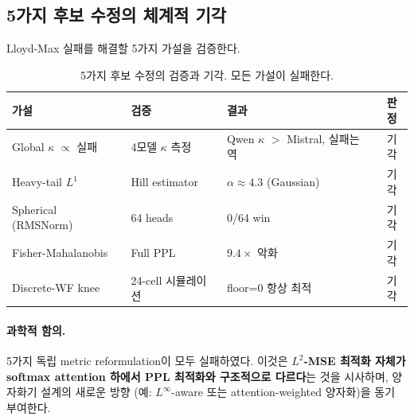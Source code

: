 \subsection{5가지 후보 수정의 체계적 기각}
\label{sec:exp_rejections}

Lloyd-Max 실패를 해결할 5가지 가설을 검증한다.

\begin{table}[t]
\centering
\caption{5가지 후보 수정의 검증과 기각. 모든 가설이 실패한다.}
\label{tab:rejections}
\small
\begin{tabular}{@{}p{2.5cm}p{3.8cm}p{2.5cm}c@{}}
\toprule
가설 & 검증 & 결과 & 판정 \\
\midrule
Global $\kappa$ $\propto$ 실패 & 4모델 $\kappa$ 측정 & Qwen $\kappa$ $>$ Mistral, 실패는 역 & 기각 \\
Heavy-tail $L^1$ & Hill estimator & $\alpha \approx 4.3$ (Gaussian) & 기각 \\
Spherical (RMSNorm) & 64 heads & 0/64 win & 기각 \\
Fisher-Mahalanobis & Full PPL & $9.4\times$ 악화 & 기각 \\
Discrete-WF knee & 24-cell 시뮬레이션 & floor=0 항상 최적 & 기각 \\
\bottomrule
\end{tabular}
\end{table}

\paragraph{과학적 함의.} 5가지 독립 metric reformulation이 모두 실패하였다. 이것은 \textbf{$L^2$-MSE 최적화 자체가 softmax attention 하에서 PPL 최적화와 구조적으로 다르다}는 것을 시사하며, 양자화기 설계의 새로운 방향 (예: $L^\infty$-aware 또는 attention-weighted 양자화)을 동기 부여한다.
